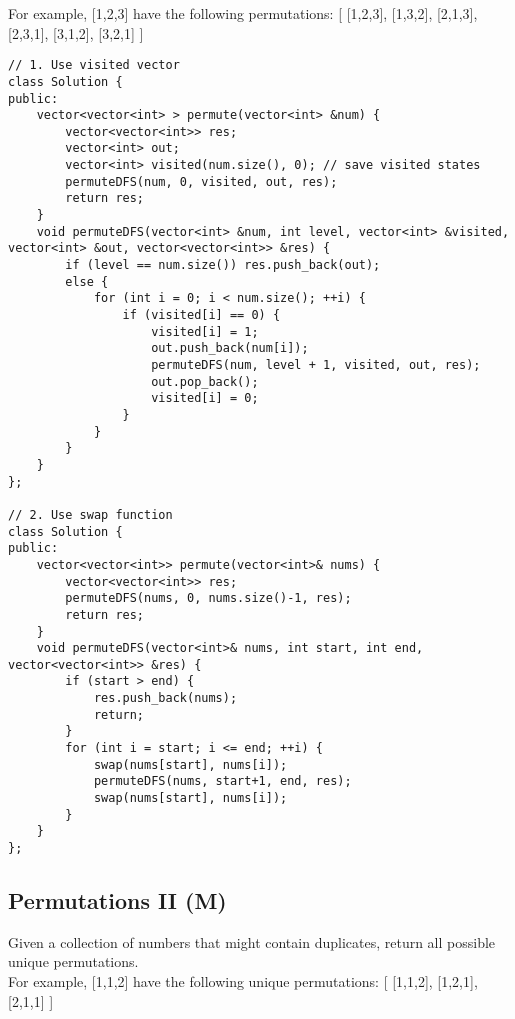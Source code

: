 For example,
[1,2,3] have the following permutations: [ [1,2,3], [1,3,2], [2,1,3], [2,3,1], [3,1,2], [3,2,1] ]\\

\begin{lstlisting}
// 1. Use visited vector
class Solution {
public:
    vector<vector<int> > permute(vector<int> &num) {
        vector<vector<int>> res;
        vector<int> out;
        vector<int> visited(num.size(), 0); // save visited states
        permuteDFS(num, 0, visited, out, res);
        return res;
    }
    void permuteDFS(vector<int> &num, int level, vector<int> &visited, vector<int> &out, vector<vector<int>> &res) {
        if (level == num.size()) res.push_back(out);
        else {
            for (int i = 0; i < num.size(); ++i) {
                if (visited[i] == 0) {
                    visited[i] = 1;
                    out.push_back(num[i]);
                    permuteDFS(num, level + 1, visited, out, res);
                    out.pop_back();
                    visited[i] = 0;
                }
            }
        }
    }
};

// 2. Use swap function
class Solution {
public:
    vector<vector<int>> permute(vector<int>& nums) {
        vector<vector<int>> res;
        permuteDFS(nums, 0, nums.size()-1, res);
        return res;
    }
    void permuteDFS(vector<int>& nums, int start, int end, vector<vector<int>> &res) {
        if (start > end) {
            res.push_back(nums);
            return;
        }
        for (int i = start; i <= end; ++i) {
            swap(nums[start], nums[i]);
            permuteDFS(nums, start+1, end, res);
            swap(nums[start], nums[i]);
        }
    }
};
\end{lstlisting}


\subsection{Permutations II (M)}
Given a collection of numbers that might contain duplicates, return all possible unique permutations.\\

For example, [1,1,2] have the following unique permutations:
[
  [1,1,2],
  [1,2,1],
  [2,1,1]
] \\

